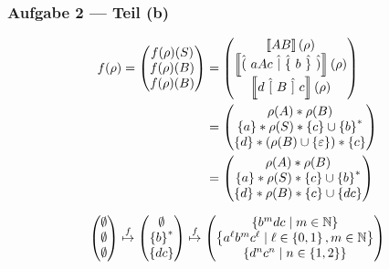 \documentclass{beamer}
\newcommand{\wdh}[1]{\hat{\{} \ #1 \ \hat{\}}}
\newcommand{\opt}[2]{\hat{(} \ #1 \ \hat{|} \ #2 \ \hat{)}}
\newcommand{\byp}[1]{\hat{[} \ #1 \ \hat{]}}
\newcommand{\sem}[1]{\left\llbracket #1 \right\rrbracket}
\begin{document}
\begin{frame} \frametitle{Aufgabe 2 --- Teil (b)}
	\small
	\begin{align*}
		f(\rho) = \begin{pmatrix} f(\rho)(S) \\ f(\rho)(B) \\ f(\rho)(B) \end{pmatrix} 
		&= \begin{pmatrix} \sem{AB}(\rho) \\ \sem{\opt{aAc}{\wdh{b}}}(\rho) \\ \sem{d \ \byp{B} \ c}(\rho) \end{pmatrix} \\
		&= \begin{pmatrix}
			\rho(A) * \rho(B) \\ \menge{a} * \rho(S) * \menge{c} \cup \menge{b}^\ast \\ \menge{d} * \brackets{\rho(B) \cup \menge{\epsilon}} * \menge{c} \end{pmatrix} \\
		&= \begin{pmatrix}
			\rho(A) * \rho(B) \\ \menge{a} * \rho(S) * \menge{c} \cup \menge{b}^\ast \\ \menge{d} * \rho(B) * \menge{c} \cup \menge{dc} \end{pmatrix}
	\end{align*}
	
	\begin{align*}
		\begin{pmatrix} \emptyset \\ \emptyset \\ \emptyset \end{pmatrix}
		\overset{f}{\mapsto}
		\begin{pmatrix} \emptyset \\ \left\{ b \right\}^\ast \\ \left\{ dc \right\} \end{pmatrix}
		\overset{f}{\mapsto}
		\begin{pmatrix} \left\{ b^m dc \mid m \in \mathbb{N} \right\} \\ \left\{ a^\ell b^m c^\ell \mid \ell \in \left\{ 0,1 \right\}, m \in \mathbb{N} \right\} \\ \left\{ d^n c^n \mid n \in \left\{ 1,2 \right\} \right\} \end{pmatrix}
	\end{align*}
\end{frame}
\end{document}
